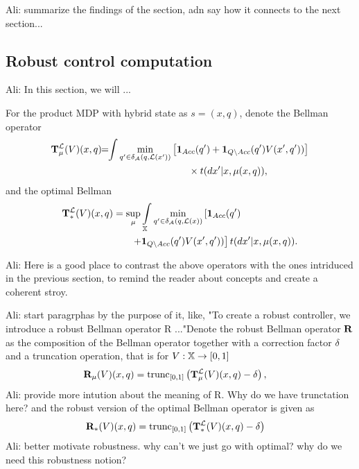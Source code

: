 \documentclass{ifacconf}
\newcommand{\red}[1]{{\color{red} #1}}
\renewcommand{\axx}[1]{{\color{orange} Ali: #1}}
\begin{document}
\axx{summarize the findings of the section, adn say how it connects to the next section...}

\subsection{Robust control computation}
\axx{In this section, we will ...
}

\red{For the product MDP with hybrid state as $s=(x, q)$, denote the Bellman operator}
\begin{align}\label{eq:V_recopt_inf}
& \Bel_\pol^\Labset (V)(x,q) \!\!=\!\!\int%
\min_{q' \in \delta_\FSA(q, \Labset( x'))}\left[\mathbf 1_{Acc}(q')+  \mathbf 1_{Q\setminus Acc}(q')V( x',q'))\right]\notag\\&\hspace{5cm}\hfill \times{\tr}(d x'|x,\pol(x,q)),
\end{align}
and the optimal Bellman 
\begin{align}\label{eq:V_recopt_inf}
& \Bel_\ast^\Labset (V)(x,q) =\sup_\pol\int_{\X}\min_{ q' \in \delta_\FSA(q, \Labset(\bar x))}\left[\mathbf 1_{Acc}( q')\right.\hspace{1.5cm}\\&\left.\hspace{2.5cm}+  \mathbf 1_{Q\setminus Acc}( q')V( x', q'))\right]\notag {\tr}(d x'
|x,\pol(x,q)).
\end{align}

\axx{Here is a good place to contrast the above operators with the ones intriduced in the previous section, to remind the reader about concepts and create a coherent stroy.}

\axx{start paragrphas by the purpose of it, like, "To create a robust controller, we introduce a robust Bellman operator R ..."}Denote the robust Bellman operator ${\mathbf {R}}$ as the composition of the Bellman operator together with a correction factor $\delta$ and  a truncation operation, that is for $V:{\mathbb{X}}\rightarrow [0,1]$
\begin{align}\label{eq:V_recopt_inf}
& {\mathbf {R}}_{\mu} (V)(x,q) = \mathop{\mathrm{trunc}}\nolimits_{[0,1]}\left({\mathbf {T}}_{\mu}^{\mathcal{L}} (V)(x,q)-\delta\right),
\end{align}
\axx{provide more intution about the meaning of R. Why do we have trunctation here?}
and the robust version of the optimal Bellman operator is given as 
\begin{align}\label{eq:V_recopt_inf}
& {\mathbf {R}}_\ast (V)(x,q)= \mathop{\mathrm{trunc}}\nolimits_{[0,1]}\left({\mathbf {T}}_\ast^{\mathcal{L}} (V)(x,q)-\delta\right)
\end{align}
\axx{better motivate robustness. why can't we just go with optimal? why do we need this robustness notion?}
\end{document}

